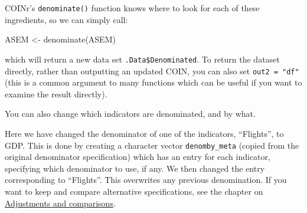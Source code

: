 \documentclass[
]{book}
\newenvironment{Shaded}{\begin{snugshade}}{\end{snugshade}}
\newcommand{\AttributeTok}[1]{\textcolor[rgb]{0.77,0.63,0.00}{#1}}
\newcommand{\CommentTok}[1]{\textcolor[rgb]{0.56,0.35,0.01}{\textit{#1}}}
\newcommand{\FunctionTok}[1]{\textcolor[rgb]{0.00,0.00,0.00}{#1}}
\newcommand{\NormalTok}[1]{#1}
\newcommand{\OtherTok}[1]{\textcolor[rgb]{0.56,0.35,0.01}{#1}}
\newcommand{\SpecialCharTok}[1]{\textcolor[rgb]{0.00,0.00,0.00}{#1}}
\newcommand{\StringTok}[1]{\textcolor[rgb]{0.31,0.60,0.02}{#1}}
\begin{document}
COINr's \texttt{denominate()} function knows where to look for each of these ingredients, so we can simply call:

\begin{Shaded}
\begin{Highlighting}[]
\NormalTok{ASEM }\OtherTok{\textless{}{-}} \FunctionTok{denominate}\NormalTok{(ASEM)}
\end{Highlighting}
\end{Shaded}

which will return a new data set \texttt{.Data\$Denominated}. To return the dataset directly, rather than outputting an updated COIN, you can also set \texttt{out2\ =\ "df"} (this is a common argument to many functions which can be useful if you want to examine the result directly).

You can also change which indicators are denominated, and by what.

\begin{Shaded}
\end{Shaded}

Here we have changed the denominator of one of the indicators, ``Flights'', to GDP. This is done by creating a character vector \texttt{denomby\_meta} (copied from the original denominator specification) which has an entry for each indicator, specifying which denominator to use, if any. We then changed the entry corresponding to ``Flights''. This overwrites any previous denomination. If you want to keep and compare alternative specifications, see the chapter on \protect\hyperlink{adjustments-and-comparisons}{Adjustments and comparisons}.
\end{document}
